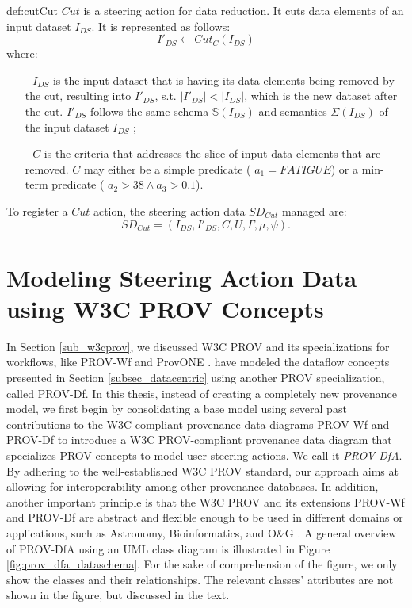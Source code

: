 \begin{mydef}{def:cut}{Cut}
$Cut$ is a steering action for data reduction. It cuts data elements of an input dataset $I_{DS}$. It is represented as follows:
$$I'_{DS} \leftarrow Cut_{C}(I_{DS})$$
where:
\begin{itemize}
    \setlength\itemsep{-2mm}
    \item[-] \noindent
        $I_{DS}$ is the input dataset that is having its data elements being removed by the cut, resulting into $I'_{DS}$, s.t. $|I'_{DS}| < |I_{DS}|$, which is the new dataset after the cut.
        $I'_{DS}$ follows the same schema $\mathbb{S}(I_{DS})$ and semantics $\Sigma(I_{DS})$ of the input dataset $I_{DS}$ ;
    \item[-] \noindent
        $C$ is the criteria that addresses the slice of input data elements that are removed. $C$ may either be a simple predicate (\eg{} $a_1 = FATIGUE$) or a min-term predicate (\eg{} $a_2 > 38 \wedge a_3 > 0.1$).
\end{itemize}

To register a $Cut$ action, the steering action data $SD_{Cut}$ managed are:
$$SD_{Cut} = (
I_{DS},
I'_{DS},
C,
U,
\Gamma,
\mu,
\psi
).$$
\end{mydef}




\section{Modeling Steering Action Data using W3C PROV Concepts}
\label{sec_provdfa}

In Section \ref{sub_w3cprov}, we discussed W3C PROV and its specializations for
workflows, like PROV-Wf \cite{Costa2013Capturing} and ProvONE \cite{ProvONE}.
\citet{Silva2017Raw} have modeled the dataflow concepts presented in
Section \ref{subsec_datacentric} using another PROV specialization, called
PROV-Df.
In this thesis,
instead of creating a completely new provenance model, we first begin by
consolidating a base model using several past contributions to the W3C-compliant provenance data diagrams PROV-Wf and
PROV-Df \cite{Souza2017Data, DeOliveira2015How, Silva2017Raw, Costa2013Capturing} to introduce a W3C PROV-compliant provenance data diagram that specializes PROV concepts to model user steering actions. We call it \textit{PROV-DfA}.
By adhering to the well-established W3C PROV standard,
our approach aims at allowing for interoperability among
other provenance databases.
In addition, another important principle is that the W3C PROV and its extensions PROV-Wf and PROV-Df are abstract and flexible
enough to be used in different domains or applications, such as Astronomy, Bioinformatics, and O\&G \cite{Ocana2011SciPhy:,Silva2017Raw,Souza2017Data,Costa2013Capturing}. A general overview of PROV-DfA using an UML class diagram is illustrated in Figure \ref{fig:prov_dfa_dataschema}.  
For the sake of comprehension of the figure, we only show the classes and their relationships. The relevant classes' attributes are not shown in the figure, but discussed in the text. 

